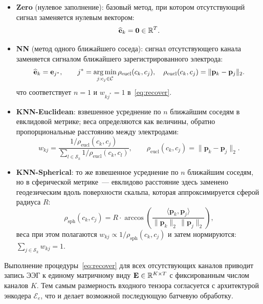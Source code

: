 \begin{itemize}
    \item \textbf{Zero} (нулевое заполнение): базовый метод, при котором отсутствующий сигнал заменяется нулевым вектором:
    \begin{equation*}
    \widehat{\mathbf{e}}_k = \mathbf{0} \in \mathbb{R}^T.
    \end{equation*}
    \item \textbf{NN} (метод одного ближайшего соседа): сигнал отсутствующего канала заменяется сигналом ближайшего зарегистрированного электрода:
    \begin{equation*}
    \widehat{\mathbf{e}}_k = \mathbf{e}_{j^*}, \qquad j^* = \operatorname*{arg\,min}_{j: c_j \in \mathcal{C}} \rho_{\text{eucl}}(c_k, c_j), \quad \rho_{\text{eucl}}(c_k, c_j) = \|\mathbf{p}_k - \mathbf{p}_j\|_2.
    \end{equation*}
    что соответствует $n = 1$ и $w_{kj^*} = 1$ в~\eqref{eq:recover}.
    \item \textbf{KNN-Euclidean}: взвешенное усреднение по $n$ ближайшим соседям в евклидовой метрике; веса определяются как величины, обратно пропорциональные расстоянию между электродами:
    \begin{equation*}
    w_{kj} = \frac{1 / \rho_{\text{eucl}}(c_k, c_j)}{\displaystyle\sum_{l \in \mathcal{S}_k} 1 / \rho_{\text{eucl}}(c_k, c_l)}, \qquad \rho_{\text{eucl}}(c_k, c_j) = \|\mathbf{p}_k - \mathbf{p}_j\|_2.
    \end{equation*}
    \item \textbf{KNN-Spherical}: то же взвешенное усреднение по $n$ ближайшим соседям, но в сферической метрике~--- евклидово расстояние здесь заменено геодезическим вдоль поверхности скальпа, которая аппроксимируется сферой радиуса $R$:
    \begin{equation*}
    \rho_{\text{sph}}(c_k, c_j) = R \cdot \arccos\!\left( \frac{\langle \mathbf{p}_k, \mathbf{p}_j \rangle}{\|\mathbf{p}_k\|_2 \, \|\mathbf{p}_j\|_2} \right),
    \end{equation*}
    веса при этом полагаются $w_{kj} \propto 1 / \rho_{\text{sph}}(c_k, c_j)$ и затем нормируются: $\sum_{j \in \mathcal{S}_k} w_{kj} = 1$.
\end{itemize}
Выполнение процедуры~\eqref{eq:recover} для всех отсутствующих каналов приводит запись ЭЭГ к единому матричному виду $\mathbf{E} \in \mathbb{R}^{K \times T}$ с фиксированным числом каналов $K$. Тем самым размерность входного тензора согласуется с архитектурой энкодера $\mathcal{E}_e$, что и делает возможной последующую батчевую обработку.

